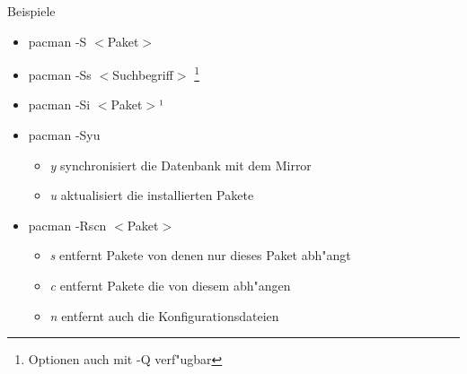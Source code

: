 \begin{slide}{Beispiele}
	\begin{itemize}
		\item{pacman -S $<$Paket$>$}
		\item{pacman -Ss $<$Suchbegriff$>$
			\footnote{Optionen auch mit -Q verf"{u}gbar}
		}
		\item{pacman -Si $<$Paket$>$¹}
		\item{pacman -Syu
			\begin{itemize}
				\item{\textit{y} synchronisiert die Datenbank mit dem Mirror}
				\item{\textit{u} aktualisiert die installierten Pakete}
			\end{itemize}
		}
		\item{pacman -Rscn $<$Paket$>$
			\begin{itemize}
				\item{\textit{s} entfernt Pakete von denen nur dieses Paket
					abh"{a}ngt}
				\item{\textit{c} entfernt Pakete die von diesem abh"{a}ngen}
				\item{\textit{n} entfernt auch die Konfigurationsdateien}
			\end{itemize}
		}
	\end{itemize}
\end{slide}

